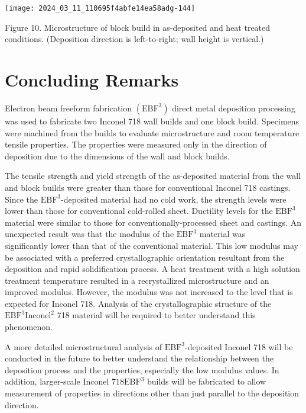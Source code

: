 \documentclass[10pt]{article}
\begin{document}
\begin{center}
\texttt{[image: 2024\_03\_11\_110695f4abfe14ea58adg-144]}
\end{center}

Figure 10. Microstructure of block build in as-deposited and heat treated conditions. (Deposition direction is left-to-right; wall height is vertical.)

\section*{Concluding Remarks}
Electron beam freeform fabrication $\left(\mathrm{EBF}^{3}\right)$ direct metal deposition processing was used to fabricate two Inconel 718 wall builds and one block build. Specimens were machined from the builds to evaluate microstructure and room temperature tensile properties. The properties were measured only in the direction of deposition due to the dimensions of the wall and block builds.

The tensile strength and yield strength of the as-deposited material from the wall and block builds were greater than those for conventional Inconel 718 castings. Since the $\mathrm{EBF}^{3}$-deposited material had no cold work, the strength levels were lower than those for conventional cold-rolled sheet. Ductility levels for the $\mathrm{EBF}^{3}$ material were similar to those for conventionally-processed sheet and castings. An unexpected result was that the modulus of the $\mathrm{EBF}^{3}$ material was\\
significantly lower than that of the conventional material. This low modulus may be associated with a preferred crystallographic orientation resultant from the deposition and rapid solidification process. A heat treatment with a high solution treatment temperature resulted in a recrystallized microstructure and an improved modulus. However, the modulus was not increased to the level that is expected for Inconel 718. Analysis of the crystallographic structure of the $\mathrm{EBF}^{3} \mathrm{Inconel}^{2}$ 718 material will be required to better understand this phenomenon.

A more detailed microstructural analysis of $\mathrm{EBF}^{3}$-deposited Inconel 718 will be conducted in the future to better understand the relationship between the deposition process and the properties, especially the low modulus values. In addition, larger-scale Inconel $718 \mathrm{EBF}^{3}$ builds will be fabricated to allow measurement of properties in directions other than just parallel to the deposition direction.
\end{document}
